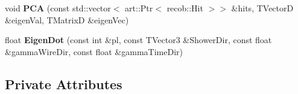 \begin{DoxyCompactItemize}
\item 
void {\bfseries P\+CA} (const std\+::vector$<$ art\+::\+Ptr$<$ recob\+::\+Hit $>$$>$ \&hits, T\+VectorD \&eigen\+Val, T\+MatrixD \&eigen\+Vec)\hypertarget{classSecondShowerPurity_a57fd30974ec2f17538f54fbeaeb6f8ef}{}\label{classSecondShowerPurity_a57fd30974ec2f17538f54fbeaeb6f8ef}

\item 
float {\bfseries Eigen\+Dot} (const int \&pl, const T\+Vector3 \&Shower\+Dir, const float \&gamma\+Wire\+Dir, const float \&gamma\+Time\+Dir)\hypertarget{classSecondShowerPurity_a7b112eddad9439ca96b2d25ce2e432b2}{}\label{classSecondShowerPurity_a7b112eddad9439ca96b2d25ce2e432b2}

\end{DoxyCompactItemize}
\subsection*{Private Attributes}

